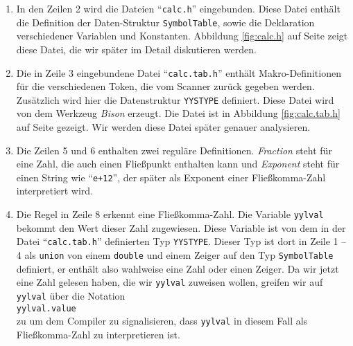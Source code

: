 \begin{enumerate}
\item In den Zeilen 2 wird die Dateien ``\texttt{calc.h}'' eingebunden.  Diese Datei
      enth\"alt die Definition der Daten-Struktur \texttt{SymbolTable}, sowie die
      Deklaration verschiedener Variablen und Konstanten.  Abbildung \ref{fig:calc.h}
      auf Seite \pageref{fig:calc.l} zeigt diese Datei, die wir sp\"ater im Detail
      diskutieren werden.
\item Die in Zeile 3 eingebundene Datei ``\texttt{calc.tab.h}'' enth\"alt Makro-Definitionen 
      f\"ur die verschiedenen Token, die vom Scanner zur\"uck gegeben werden.
      Zus\"atzlich wird hier die Datenstruktur \texttt{YYSTYPE} definiert.
      Diese Datei wird von dem Werkzeug \textsl{Bison} erzeugt.
      Die Datei ist in Abbildung \ref{fig:calc.tab.h} auf Seite \pageref{fig:calc.tab.h} gezeigt.
      Wir werden diese Datei sp\"ater genauer analysieren.
\item Die Zeilen 5 und 6 enthalten zwei regul\"are Definitionen.
      \textsl{Fraction} steht f\"ur eine Zahl, die auch einen Flie{\ss}punkt enthalten kann
      und \textsl{Exponent} steht f\"ur einen String wie ``\texttt{e+12}'', der sp\"ater 
      als Exponent  einer Flie{\ss}komma-Zahl interpretiert wird.
\item Die Regel in Zeile 8 erkennt eine Flie{\ss}komma-Zahl.  Die Variable
      \texttt{yylval} bekommt den Wert dieser Zahl zugewiesen.  Diese Variable 
      ist von dem in der Datei ``\texttt{calc.tab.h}'' definierten Typ
      \texttt{YYSTYPE}.  Dieser Typ ist dort in Zeile 1 -- 4 als \texttt{union}
      von einem \texttt{double} und einem Zeiger auf den Typ \texttt{SymbolTable}
      definiert, er enth\"alt also wahlweise eine Zahl oder einen Zeiger.
      Da wir jetzt eine Zahl gelesen haben, die wir \texttt{yylval} zuweisen wollen,
      greifen wir auf \texttt{yylval} \"uber die Notation
      \\[0.2cm]
      \hspace*{1.3cm}
      \texttt{yylval.value}
      \\[0.2cm]
      zu um dem Compiler zu signalisieren, dass \texttt{yylval} in diesem Fall als
      Flie{\ss}komma-Zahl zu interpretieren ist.
      

\end{enumerate}
